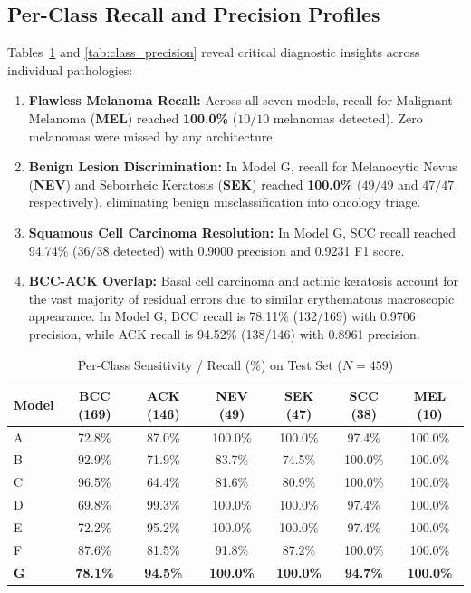 \documentclass[conference]{IEEEtran}
\begin{document}
\subsection{Per-Class Recall and Precision Profiles}
Tables~\ref{tab:class_recall} and \ref{tab:class_precision} reveal critical diagnostic insights across individual pathologies:
\begin{enumerate}
    \item \textbf{Flawless Melanoma Recall:} Across all seven models, recall for Malignant Melanoma (\textbf{MEL}) reached \textbf{100.0\%} ($10/10$ melanomas detected). Zero melanomas were missed by any architecture.
    \item \textbf{Benign Lesion Discrimination:} In Model G, recall for Melanocytic Nevus (\textbf{NEV}) and Seborrheic Keratosis (\textbf{SEK}) reached \textbf{100.0\%} ($49/49$ and $47/47$ respectively), eliminating benign misclassification into oncology triage.
    \item \textbf{Squamous Cell Carcinoma Resolution:} In Model G, SCC recall reached 94.74\% ($36/38$ detected) with 0.9000 precision and 0.9231 F1 score.
    \item \textbf{BCC-ACK Overlap:} Basal cell carcinoma and actinic keratosis account for the vast majority of residual errors due to similar erythematous macroscopic appearance. In Model G, BCC recall is 78.11\% (132/169) with 0.9706 precision, while ACK recall is 94.52\% (138/146) with 0.8961 precision.
\end{enumerate}

\begin{table}[t]
\caption{Per-Class Sensitivity / Recall (\%) on Test Set ($N=459$)}
\label{tab:class_recall}
\centering
\scriptsize
\setlength{\tabcolsep}{3.5pt}
\begin{tabular}{@{}lcccccc@{}}
\toprule
\textbf{Model} & \textbf{BCC (169)} & \textbf{ACK (146)} & \textbf{NEV (49)} & \textbf{SEK (47)} & \textbf{SCC (38)} & \textbf{MEL (10)} \\
\midrule
A & 72.8\% & 87.0\% & 100.0\% & 100.0\% & 97.4\% & 100.0\% \\
B & 92.9\% & 71.9\% & 83.7\% & 74.5\% & 100.0\% & 100.0\% \\
C & 96.5\% & 64.4\% & 81.6\% & 80.9\% & 100.0\% & 100.0\% \\
D & 69.8\% & 99.3\% & 100.0\% & 100.0\% & 97.4\% & 100.0\% \\
E & 72.2\% & 95.2\% & 100.0\% & 100.0\% & 97.4\% & 100.0\% \\
F & 87.6\% & 81.5\% & 91.8\% & 87.2\% & 100.0\% & 100.0\% \\
\textbf{G} & \textbf{78.1\%} & \textbf{94.5\%} & \textbf{100.0\%} & \textbf{100.0\%} & \textbf{94.7\%} & \textbf{100.0\%} \\
\bottomrule
\end{tabular}
\end{table}
\end{document}
